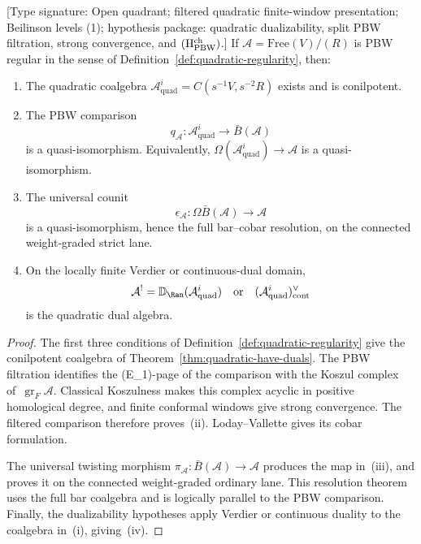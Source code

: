 \begin{theorem}\label{thm:regular-implies-koszul}
\textup{[Type signature: Open quadrant; filtered quadratic
finite-window presentation; Beilinson levels (1);
hypothesis package: quadratic dualizability, split PBW filtration,
strong convergence, and $({\rm H}^{\rm ch}_{\rm PBW})$.]}
If $\mathcal{A} = \text{Free}(V) / (R)$ is PBW regular in the sense of
Definition~\ref{def:quadratic-regularity}, then:
\begin{enumerate}[label=\textup{(\roman*)}]
\item The quadratic coalgebra
 $\mathcal A^i_{\mathrm{quad}}=C(s^{-1}V,s^{-2}R)$ exists and is conilpotent.
\item The PBW comparison
 \[
  q_{\mathcal A}\colon
  \mathcal A^i_{\mathrm{quad}}\longrightarrow\bar B(\mathcal A)
 \]
 is a quasi-isomorphism.  Equivalently,
 $\Omega(\mathcal A^i_{\mathrm{quad}})\to\mathcal A$ is a
 quasi-isomorphism.
\item The universal counit
 \[
  \epsilon_{\mathcal A}\colon
  \Omega\bar B(\mathcal A)\longrightarrow\mathcal A
 \]
 is a quasi-isomorphism, hence the full bar--cobar resolution, on the
 connected weight-graded strict lane.
\item On the locally finite Verdier or continuous-dual domain,
 \[
  \mathcal A^!
  =\mathbb D_{\Ran}(\mathcal A^i_{\mathrm{quad}})
  \quad\text{or}\quad
  (\mathcal A^i_{\mathrm{quad}})^\vee_{\mathrm{cont}}
 \]
 is the quadratic dual algebra.
\end{enumerate}
\end{theorem}

\begin{proof}
The first three conditions of
Definition~\ref{def:quadratic-regularity} give the conilpotent
coalgebra of Theorem~\ref{thm:quadratic-have-duals}.  The PBW
filtration identifies the (E_1)-page of the comparison with the
Koszul complex of~$\operatorname{gr}_F\mathcal A$.  Classical
Koszulness makes this complex acyclic in positive homological degree,
and finite conformal windows give strong convergence.  The filtered
comparison therefore proves~(ii).  Loday--Vallette
\cite[Theorem~3.4.6]{LV12} gives its cobar formulation.

The universal twisting morphism
$\pi_{\mathcal A}\colon\bar B(\mathcal A)\to\mathcal A$ produces the
map in~(iii), and \cite[Corollary~2.3.4]{LV12} proves it on the
connected weight-graded ordinary lane.  This resolution theorem uses
the full bar coalgebra and is logically parallel to the PBW
comparison.  Finally, the dualizability hypotheses apply Verdier or
continuous duality to the coalgebra in~(i), giving~(iv).
\end{proof}


